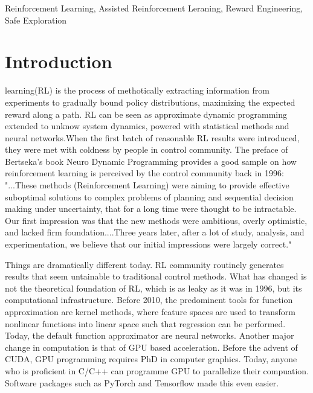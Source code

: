 \documentclass[journal]{IEEEtran}
\begin{document}
\begin{IEEEkeywords}
Reinforcement Learning, Assisted Reinforcement Leraning, Reward Engineering, Safe Exploration
\end{IEEEkeywords}
\IEEEpeerreviewmaketitle
\section{Introduction}
 learning(RL) is the process of methotically extracting information from experiments to gradually bound policy distributions, maximizing the expected reward along a path. RL can be seen as approximate dynamic programming extended to unknow system dynamics, powered with statistical methods and neural networks.When the first batch of reasonable RL results were introduced, they were met with coldness by people in control community. The preface of Bertseka's book Neuro Dynamic Programming provides a good sample on how reinforcement learning is perceived by the control community back in 1996: "...These methods (Reinforcement Learning) were aiming to provide effective suboptimal solutions to complex problems of planning and sequential decision making under uncertainty, that for a long time were thought to be intractable. Our first impression was that the new methods were ambitious, overly optimistic, and lacked firm foundation....Three years later, after a lot of study, analysis, and experimentation, we believe that our initial impressions were largely correct." \cite{Bertsekas1996NeuroDynamicP}

Things are dramatically different today. RL community routinely generates results that seem untainable to traditional control methods. What has changed is not the theoretical foundation of RL, which is as leaky as it was in 1996, but its computational infrastructure. Before 2010, the predominent tools for function approximation are kernel methods, where feature spaces are used to transform nonlinear functions into linear space such that regression can be performed. Today, the default function approximator are neural networks. Another major change in computation is that of GPU based acceleration. Before the advent of CUDA, GPU programming requires PhD in computer graphics. Today, anyone who is proficient in C/C++ can programme GPU to parallelize their compuation. Software packages such as PyTorch and Tensorflow made this even easier.
\end{document}
